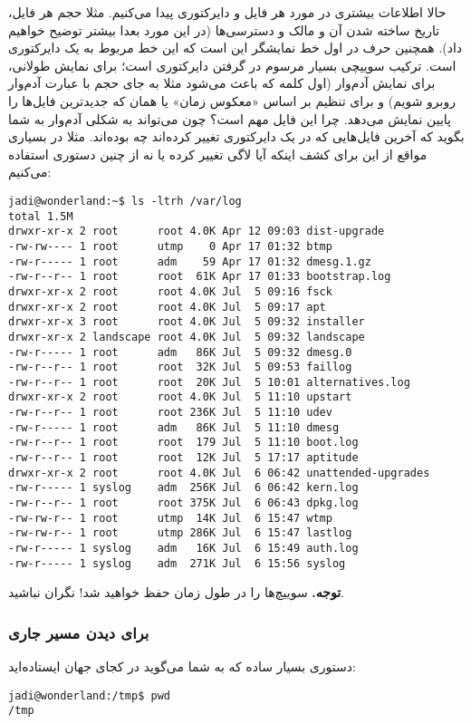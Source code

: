 حالا اطلاعات بیشتری در مورد هر فایل و دایرکتوری پیدا می‌کنیم. مثلا حجم هر فایل، تاریخ ساخته شدن آن و مالک و دسترسی‌ها (در این مورد بعدا بیشتر توضیح خواهیم داد). همچنین حرف  در اول خط نمایشگر این است که این خط مربوط به یک دایرکتوری است. ترکیب سوییچی بسیار مرسوم در گرفتن دایرکتوری 
 است؛  برای نمایش طولانی،  برای نمایش آدم‌وار (اول کلمه 
 که باعث می‌شود مثلا به جای حجم 
 با عبارت آدم‌وار  روبرو شویم) و  برای تنظیم بر اساس «معکوس زمان» یا همان 
 که جدیدترین فایل‌ها را پایین نمایش می‌دهد. چرا این فایل مهم است؟ چون می‌تواند به شکلی آدم‌وار به شما بگوید که آخرین فایل‌هایی که در یک دایرکتوری تغییر کرده‌اند چه بوده‌اند. مثلا در بسیاری مواقع از این برای کشف اینکه آیا لاگی تغییر کرده یا نه از چنین دستوری استفاده می‌کنیم:
\begin{frameng}
\small
\begin{lstlisting}
jadi@wonderland:~$ ls -ltrh /var/log
total 1.5M
drwxr-xr-x 2 root      root 4.0K Apr 12 09:03 dist-upgrade
-rw-rw---- 1 root      utmp    0 Apr 17 01:32 btmp
-rw-r----- 1 root      adm    59 Apr 17 01:32 dmesg.1.gz
-rw-r--r-- 1 root      root  61K Apr 17 01:33 bootstrap.log
drwxr-xr-x 2 root      root 4.0K Jul  5 09:16 fsck
drwxr-xr-x 2 root      root 4.0K Jul  5 09:17 apt
drwxr-xr-x 3 root      root 4.0K Jul  5 09:32 installer
drwxr-xr-x 2 landscape root 4.0K Jul  5 09:32 landscape
-rw-r----- 1 root      adm   86K Jul  5 09:32 dmesg.0
-rw-r--r-- 1 root      root  32K Jul  5 09:53 faillog
-rw-r--r-- 1 root      root  20K Jul  5 10:01 alternatives.log
drwxr-xr-x 2 root      root 4.0K Jul  5 11:10 upstart
-rw-r--r-- 1 root      root 236K Jul  5 11:10 udev
-rw-r----- 1 root      adm   86K Jul  5 11:10 dmesg
-rw-r--r-- 1 root      root  179 Jul  5 11:10 boot.log
-rw-r--r-- 1 root      root  12K Jul  5 17:17 aptitude
drwxr-xr-x 2 root      root 4.0K Jul  6 06:42 unattended-upgrades
-rw-r----- 1 syslog    adm  256K Jul  6 06:42 kern.log
-rw-r--r-- 1 root      root 375K Jul  6 06:43 dpkg.log
-rw-rw-r-- 1 root      utmp  14K Jul  6 15:47 wtmp
-rw-rw-r-- 1 root      utmp 286K Jul  6 15:47 lastlog
-rw-r----- 1 syslog    adm   16K Jul  6 15:49 auth.log
-rw-r----- 1 syslog    adm  271K Jul  6 15:56 syslog
\end{lstlisting}
\end{frameng}

\textbf{توجه.}
سوییچ‌ها را در طول زمان حفظ خواهید شد! نگران نباشید.
\subsubsection*{ برای دیدن مسیر جاری}
دستوری بسیار ساده که به شما می‌گوید در کجای جهان ایستاده‌اید:
\begin{frameng}
\begin{lstlisting}
jadi@wonderland:/tmp$ pwd
/tmp
\end{lstlisting}
\end{frameng}

